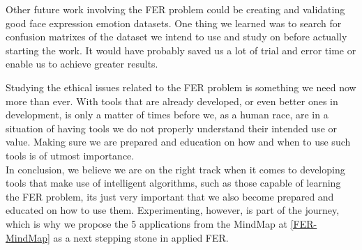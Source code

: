 \documentclass[runningheads,a4paper,11pt]{report}
\begin{document}
Other future work involving the FER problem could be creating and validating good face expression emotion datasets. One thing we learned was to search for confusion matrixes of the dataset we intend to use and study on before actually starting the work. It would have probably saved us a lot of trial and error time or enable us to achieve greater results.

Studying the ethical issues related to the FER problem is something we need now more than ever. With tools that are already developed, or even better ones in development, is only a matter of times before we, as a human race, are in a situation of having tools we do not properly understand their intended use or value. Making sure we are prepared and education on how and when to use such tools is of utmost importance.\\

In conclusion, we believe we are on the right track when it comes to developing tools that make use of intelligent algorithms, such as those capable of learning the FER problem, its just very important that we also become prepared and educated on how to use them. Experimenting, however, is part of the journey, which is why we propose the 5 applications from the MindMap at \ref{FER-MindMap} as a next stepping stone in applied FER.




\end{document}
